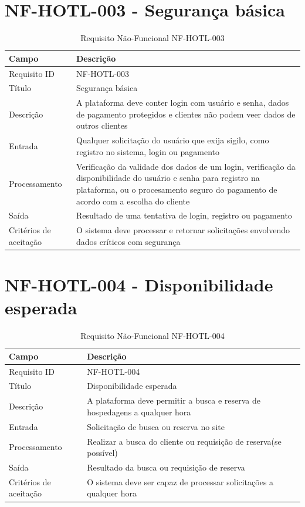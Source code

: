 \documentclass[
    12pt,
    oneside,
    a4paper,
    brazil
]{abntex2}
\begin{document}
\section{NF-HOTL-003 - Segurança básica}

\begin{table}[h]
	\begin{tabular}{|l|p{10cm}|}
		\hline
		\textbf{Campo} & \textbf{Descrição} \\
		\hline
		Requisito ID & NF-HOTL-003 \\
		\hline
		Título & Segurança básica\\
		\hline
		Descrição &  A plataforma deve conter login com usuário e senha, dados de pagamento protegidos e clientes não podem veer dados de outros clientes\\
		\hline
		Entrada & Qualquer solicitação do usuário que exija sigilo, como registro no sistema, login ou pagamento\\
		\hline
		Processamento & Verificação da validade dos dados de um login, verificação da disponibilidade do usuário e senha para registro na plataforma, ou o procesamento seguro do pagamento de acordo com a escolha do cliente\\
		\hline
		Saída & Resultado de uma tentativa de login, registro ou pagamento\\
		\hline
		Critérios de aceitação & O sistema deve processar e retornar solicitações envolvendo dados críticos com segurança\\
		\hline
	\end{tabular}
	\caption{Requisito Não-Funcional NF-HOTL-003}
\end{table}

\section{NF-HOTL-004 - Disponibilidade esperada}

\begin{table}[h]
	\begin{tabular}{|l|p{10cm}|}
		\hline
		\textbf{Campo} & \textbf{Descrição} \\
		\hline
		Requisito ID & NF-HOTL-004 \\
		\hline
		Título & Disponibilidade esperada\\
		\hline
		Descrição &  A plataforma deve permitir a busca e reserva de hospedagens a qualquer hora\\
		\hline
		Entrada & Solicitação de busca ou reserva no site\\
		\hline
		Processamento & Realizar a busca do cliente ou requisição de reserva(se possível)\\
		\hline
		Saída & Resultado da busca ou requisição de reserva\\
		\hline
		Critérios de aceitação & O sistema deve ser capaz de processar solicitações a qualquer hora\\
		\hline
	\end{tabular}
	\caption{Requisito Não-Funcional NF-HOTL-004}
\end{table}
\end{document}
